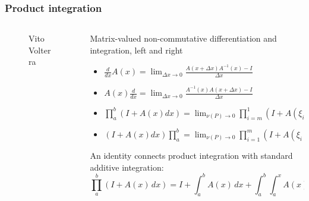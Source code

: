 \documentclass[aspectratio=169]{beamer}
\begin{document}
\begin{frame}
    \frametitle{Product integration}
    \begin{columns}
            \begin{column}{0.3\textwidth}
                \begin{figure}[ht]\centering
                \caption{Vito Volterra}
                \end{figure}
            \end{column}
            \begin{column}{0.7\textwidth}
            Matrix-valued non-commutative differentiation and integration, left and right
            \begin{itemize}
                \item $\frac{d}{dx} A(x) = \lim_{\Delta x \to 0} \frac{A(x + \Delta x) A^{-1}(x) - I}{\Delta x}$
                \item $A(x) \frac{d}{dx} = \lim_{\Delta x \to 0} \frac{A^{-1}(x) A(x + \Delta x) - I}{\Delta x}$
                \item $\prod_{a}^{b} (I + A(x) dx) = \lim_{\nu(P) \to 0} \prod_{i=m}^{1}(I + A(\xi_i))$
                \item $(I + A(x) dx) \prod_{a}^{b}  = \lim_{\nu(P) \to 0} \prod_{i=1}^{m}(I + A(\xi_i))$
            \end{itemize}
            An identity connects product integration with standard additive integration:
            \[
              \prod_a^b (I + A(x)\,dx)
              = I + \int_a^b A(x)\,dx + \int_a^b \int_a^x A(x)A(y)\,dy\,dx + \cdots
            \]
            \end{column}
    \end{columns}
\end{frame}
\end{document}
